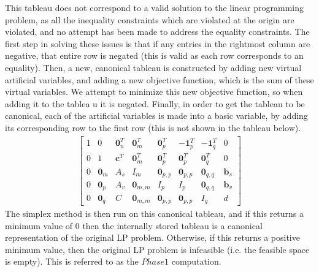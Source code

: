 \documentclass[10pt]{article}
\renewcommand{\vec}[1]{\mathbf{#1}}
\newcommand{\vz}[1]{\vec{0}_{#1}}
\renewcommand{\b}{\vec{b}}
\renewcommand{\c}{\vec{c}}
\begin{document}
This tableau does not correspond to a valid solution to the linear programming problem, as all the inequality constraints which are violated at the origin are violated, and no attempt has been made to address the equality constraints. The first step in solving these issues is that if any entries in the rightmost column are negative, that entire row is negated (this is valid as each row corresponds to an equality). Then, a new, canonical tableau is constructed by adding new virtual artificial variables, and adding a new objective function, which is the sum of these virtual variables. We attempt to minimize this new objective function, so when adding it to the tablea 	u it is negated. Finally, in order to get the tableau to be canonical, each of the artificial variables is made into a basic variable, by adding its corresponding row to the first row (this is not shown in the tableau below). 
\begin{align*}
\begin{bmatrix}
1	& 0 		& \vz{n}^T	& \vz{m}^T	& \vz{p}^T	& -\vec{1}_p^T	& -\vec{1}_q^T	& 0\\
0	& 1			& \c^T		& \vz{m}^T	& \vz{p}^T	& \vz{p}^T		& \vz{q}^T		& 0\\
0	& \vz{m}	& A_s		& I_m 		& \vz{p,p}	& \vz{p,p}		& \vz{q,q}		& \b_s\\
0	& \vz{p}	& A_v		& \vz{m,m}	& I_p		& I_p			& \vz{q,q}		& \b_v\\
0	& \vz{q}	& C			& \vz{m,m}	& \vz{p,p}	& \vz{p,p}		& I_q			& d
\end{bmatrix}
\end{align*}
The simplex method is then run on this canonical tableau, and if this returns a minimum value of 0 then the internally stored tableau is a canonical representation of the original LP problem. Otherwise, if this returns a positive minimum value, then the original LP problem is infeasible (i.e. the feasible space is empty). This is referred to as the $Phase 1$ computation.\cite{murty}
\end{document}
